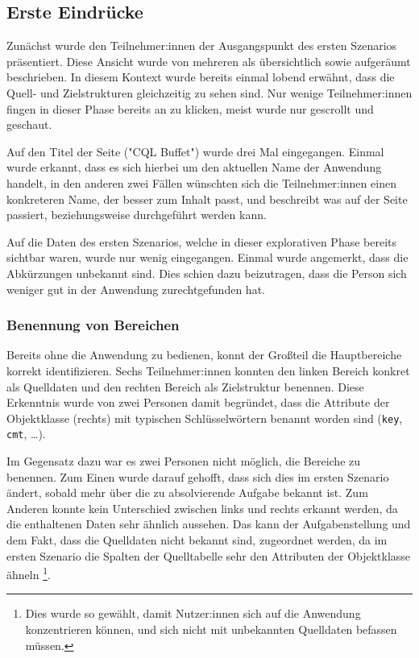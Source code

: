 \subsection{Erste Eindrücke}

Zunächst wurde den Teilnehmer:innen der Ausgangspunkt des ersten Szenarios präsentiert. Diese Ansicht wurde von mehreren als übersichtlich sowie aufgeräumt beschrieben. In diesem Kontext wurde bereits einmal lobend erwähnt, dass die Quell- und Zielstrukturen gleichzeitig zu sehen sind. Nur wenige Teilnehmer:innen fingen in dieser Phase bereits an zu klicken, meist wurde nur gescrollt und geschaut.

Auf den Titel der Seite ("CQL Buffet") wurde drei Mal eingegangen. Einmal wurde erkannt, dass es sich hierbei um den aktuellen Name der Anwendung handelt, in den anderen zwei Fällen wünschten sich die Teilnehmer:innen einen konkreteren Name, der besser zum Inhalt passt, und beschreibt was auf der Seite passiert, beziehungsweise durchgeführt werden kann.

Auf die Daten des ersten Szenarios, welche in dieser explorativen Phase bereits sichtbar waren, wurde nur wenig eingegangen. Einmal wurde angemerkt, dass die Abkürzungen unbekannt sind. Dies schien dazu beizutragen, dass die Person sich weniger gut in der Anwendung zurechtgefunden hat.

\subsubsection{Benennung von Bereichen}

Bereits ohne die Anwendung zu bedienen, konnt der Großteil die Hauptbereiche korrekt identifizieren. Sechs Teilnehmer:innen konnten den linken Bereich konkret als Quelldaten und den rechten Bereich als Zielstruktur benennen. Diese Erkenntnis wurde von zwei Personen damit begründet, dass die Attribute der Objektklasse (rechts) mit typischen Schlüsselwörtern benannt worden sind (\texttt{key}, \texttt{cmt}, \dots).

Im Gegensatz dazu war es zwei Personen nicht möglich, die Bereiche zu benennen. Zum Einen wurde darauf gehofft, dass sich dies im ersten Szenario ändert, sobald mehr über die zu absolvierende Aufgabe bekannt ist. Zum Anderen konnte kein Unterschied zwischen links und rechts erkannt werden, da die enthaltenen Daten sehr ähnlich aussehen. Das kann der Aufgabenstellung und dem Fakt, dass die Quelldaten nicht bekannt sind, zugeordnet werden, da im ersten Szenario die Spalten der Quelltabelle sehr den Attributen der Objektklasse ähneln \footnote{Dies wurde so gewählt, damit Nutzer:innen sich auf die Anwendung konzentrieren können, und sich nicht mit unbekannten Quelldaten befassen müssen.}.

